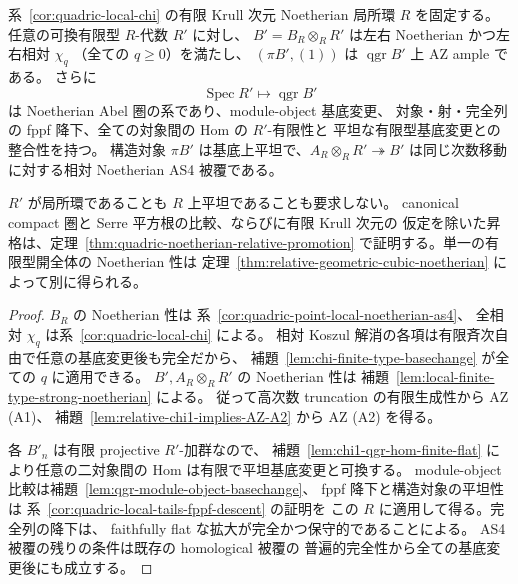 \begin{theorem}
\label{thm:quadric-local-finite-type-abelian-system}
系~\ref{cor:quadric-local-chi} の有限 Krull 次元 Noetherian 局所環
$R$ を固定する。任意の可換有限型 $R$-代数 $R'$ に対し、
$B'=B_R\otimes_RR'$ は左右 Noetherian かつ左右相対 $\chi_q$
（全ての $q\ge0$）を満たし、
$(\pi B',(1))$ は $\operatorname{qgr}B'$ 上 AZ ample である。
さらに
\[
 \operatorname{Spec}R'\longmapsto\operatorname{qgr}B'
 \tag{Local-tails}\label{eq:local-finite-type-tails-system}
\]
は Noetherian Abel 圏の系であり、module-object 基底変更、
対象・射・完全列の fppf 降下、全ての対象間の Hom の $R'$-有限性と
平坦な有限型基底変更との整合性を持つ。
構造対象 $\pi B'$ は基底上平坦で、$A_R\otimes_RR'\twoheadrightarrow B'$
は同じ次数移動に対する相対 Noetherian AS4 被覆である。

$R'$ が局所環であることも $R$ 上平坦であることも要求しない。
canonical compact 圏と Serre 平方根の比較、ならびに有限 Krull 次元の
仮定を除いた昇格は、定理~\ref{thm:quadric-noetherian-relative-promotion}
で証明する。単一の有限型開全体の Noetherian 性は
定理~\ref{thm:relative-geometric-cubic-noetherian} によって別に得られる。
\end{theorem}
\begin{proof}
$B_R$ の Noetherian 性は
系~\ref{cor:quadric-point-local-noetherian-as4}、
全相対 $\chi_q$ は系~\ref{cor:quadric-local-chi} による。
相対 Koszul 解消の各項は有限斉次自由で任意の基底変更後も完全だから、
補題~\ref{lem:chi-finite-type-basechange} が全ての $q$ に適用できる。
$B',A_R\otimes_RR'$ の Noetherian 性は
補題~\ref{lem:local-finite-type-strong-noetherian} による。
従って高次数 truncation の有限生成性から AZ (A1)、
補題~\ref{lem:relative-chi1-implies-AZ-A2} から AZ (A2) を得る。

各 $B'_n$ は有限 projective $R'$-加群なので、
補題~\ref{lem:chi1-qgr-hom-finite-flat} により任意の二対象間の
Hom は有限で平坦基底変更と可換する。
module-object 比較は補題~\ref{lem:qgr-module-object-basechange}、
fppf 降下と構造対象の平坦性は
系~\ref{cor:quadric-local-tails-fppf-descent} の証明を
この $R$ に適用して得る。完全列の降下は、
faithfully flat な拡大が完全かつ保守的であることによる。
AS4 被覆の残りの条件は既存の homological 被覆の
普遍的完全性から全ての基底変更後にも成立する。
\end{proof}

